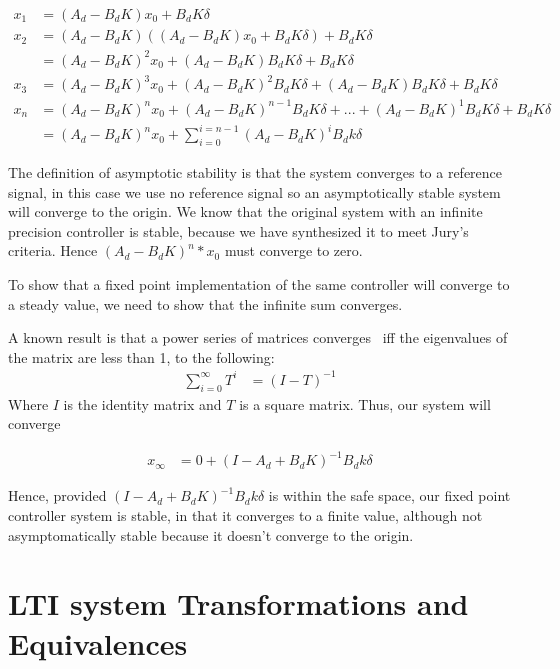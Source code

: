 \documentclass[runningheads,a4paper]{llncs}
\begin{document}
\begin{align*}
x_{1} &= (A_d  - B_dK)x_0 + B_dK\delta \\
x_{2} &= (A_d  - B_dK)((A_d  - B_dK)x_0 + B_dK\delta ) + B_dK\delta \\
      &=(A_d  - B_dK)^2x_0 + (A_d  - B_dK)B_dK\delta + B_dK\delta \\
x_{3}  &=(A_d  - B_dK)^3x_0 + (A_d  - B_dK)^2B_dK\delta + (A_d  - B_dK)B_dK\delta + B_dK\delta\\
x_{n} &= (A_d  - B_dK)^nx_0 + (A_d  - B_dK)^{n-1}B_dK\delta + ... + (A_d  - B_dK)^1B_dK \delta + B_dK\delta \\
  &= (A_d - B_dK)^nx_0 + \sum_{i=0}^{i=n-1}(A_d - B_dK)^iB_dk\delta
\end{align*}

The definition of asymptotic stability is that the system converges to a reference signal, in this case we use no
reference signal so an asymptotically stable system will converge to the origin. We know that the original system
with an infinite precision controller is stable, because we have synthesized it to meet Jury's criteria. Hence
$(A_d  - B_dK)^n*x_0$ must converge to zero. 

To show that a fixed point implementation of the same controller will converge to a steady value, we need to show that the infinite sum converges.

A known result is that a power series of matrices converges~\cite{horn1990matrix} iff the eigenvalues of the matrix are less than 1, to the following:
\begin{align*}
\sum_{i=0}^{\infty}T^i  &= (I - T)^{-1}
\end{align*}
Where $I$ is the identity matrix and $T$ is a square matrix. Thus, our system will converge

\begin{align*}
x_{\infty} &= 0 + (I - A_d + B_dK)^{-1}B_dk\delta
\end{align*}

Hence, provided $(I - A_d + B_dK)^{-1}B_dk\delta$ is within the safe space, our fixed point controller system is stable, in that it converges to a finite value, although not asymptomatically stable because it doesn't converge to the origin.


\section{LTI system Transformations and Equivalences} \label{sec:appendix:LTIbackground}
\end{document}
